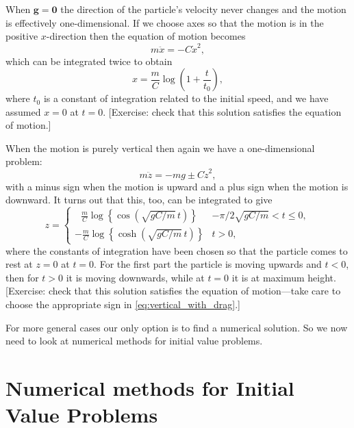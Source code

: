 When $\boldsymbol{g} = \boldsymbol{0}$ the direction of the particle's velocity never
changes and the motion is effectively one-dimensional. If we choose axes so that
the motion is in the positive $x$-direction then the equation of motion becomes
\begin{displaymath}
m \ddot{x} = - C \dot{x}^2 ,
\end{displaymath}
which can be integrated twice to obtain
\begin{displaymath}
x = \frac{m}{C} \log \left( 1 + \frac{t}{t_0} \right) ,
\end{displaymath}
where $t_0$ is a constant of integration related to the initial speed, and we have
assumed $x=0$ at $t=0$. [Exercise: check that this solution satisfies the equation of
motion.] 

When the motion is purely vertical then again we have a one-dimensional problem:
\begin{equation}
\label{eq:vertical_with_drag}
m \ddot{z} = - m g \pm C \dot{z}^2 ,
\end{equation}
with a minus sign when the motion is upward and a plus sign when the motion is downward.
It turns out that this, too, can be integrated to give
\begin{displaymath}
z = \left\{
\begin{array}{ll}
\ \ \ \frac{m}{C} \log \left\{ \cos \left( \sqrt{gC/m} \, t \right) \right\}  &
- \pi / 2 \sqrt{gC/m} < t \le 0 ,\\
- \frac{m}{C} \log \left\{ \cosh \left( \sqrt{gC/m} \, t \right) \right\}  &
t > 0 ,
\end{array}
\right.
\end{displaymath}
where the constants of integration have been chosen so that the particle comes to rest
at $z=0$ at $t=0$. For the first part the particle is moving upwards and $t<0$, then for 
$t>0$ it is moving downwards, while  at $t=0$ it is at maximum height.
[Exercise: check that this solution satisfies the equation of motion---take care to
choose the appropriate sign in \eqref{eq:vertical_with_drag}.]

For more general cases our only option is to find a numerical solution.
So we now need to look at numerical methods for initial value problems.


\section{Numerical methods for Initial Value Problems}
\label{sec:time_stepping}

